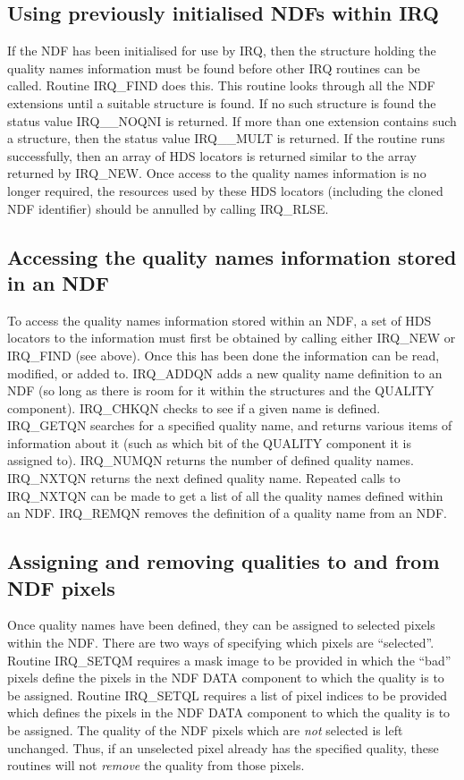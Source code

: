 \subsection{Using previously initialised NDFs within IRQ}
If the NDF has been initialised for use by IRQ, then the structure holding the
quality names information must be found before other IRQ routines can be called.
Routine IRQ\_FIND does this. This routine looks through all the NDF extensions
until a suitable structure is found. If no such structure is found the status
value IRQ\_\_NOQNI is returned. If more than one extension contains such a
structure, then the status value IRQ\_\_MULT is returned. If the routine runs
successfully, then an array of HDS locators is returned similar to the array
returned by IRQ\_NEW. Once access to the quality names information is no longer
required, the resources used by these HDS locators (including the cloned
NDF identifier) should be annulled by calling IRQ\_RLSE.

\subsection{Accessing the quality names information stored in an NDF}
To access the quality names information stored within an NDF, a set of HDS
locators to the information must first be obtained by calling either IRQ\_NEW or
IRQ\_FIND (see above). Once this has been done the information can be read,
modified, or added to. IRQ\_ADDQN adds a new quality name definition to an NDF
(so long as there is room for it within the structures and the QUALITY
component). IRQ\_CHKQN checks to see if a given name is defined. IRQ\_GETQN
searches for a specified quality name, and
returns various items of information about it (such as which bit of the QUALITY
component it is assigned to). IRQ\_NUMQN returns the number of defined quality
names. IRQ\_NXTQN returns the next defined quality name. Repeated calls to
IRQ\_NXTQN can be made to get a list of all the quality names defined within an
NDF. IRQ\_REMQN removes the definition of a quality name from an NDF.

\subsection{Assigning and removing qualities to and from NDF pixels}
Once quality names have been defined, they can be assigned to selected pixels
within the NDF. There are two ways of specifying which pixels are ``selected''.
Routine IRQ\_SETQM requires a mask image to be provided in which the ``bad''
pixels define the pixels in the NDF DATA component to which the quality is to be
assigned. Routine IRQ\_SETQL requires a list of pixel indices to be provided
which defines the pixels in the NDF DATA component to which the quality is to be
assigned. The quality of the NDF pixels which are {\em not} selected is left
unchanged. Thus, if an unselected pixel already has the specified quality, these
routines will not {\em remove} the quality from those pixels.

